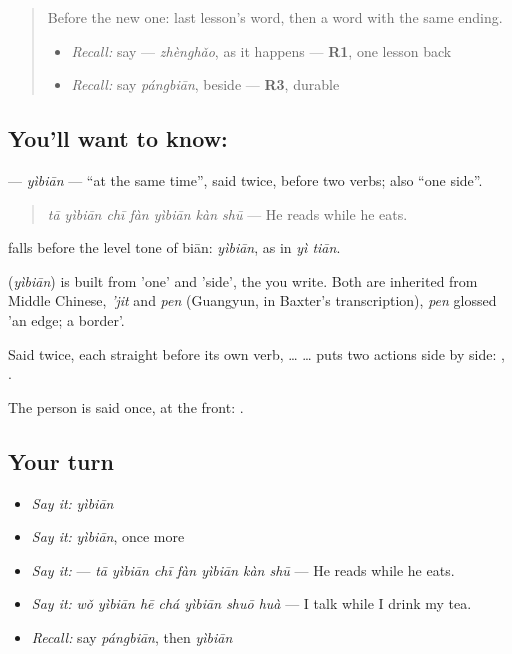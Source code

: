 \label{lesson:ZH-C149-yibian}



\begin{quote}
Before the new one: last lesson's word, then a word with the same ending.

\begin{itemize}
\raggedright
  \item \emph{Recall:} say  — \emph{zhènghǎo}, as it happens — \textbf{R1}, one lesson back
  \item \emph{Recall:} say \emph{pángbiān}, beside — \textbf{R3}, durable
\end{itemize}
\end{quote}

\subsection*{You'll want to know: }
\textbf{} — \emph{yìbiān} — \textquotedblleft{}at the same time\textquotedblright{}, said twice, before two verbs; also \textquotedblleft{}one side\textquotedblright{}.

\begin{quote}
\textbf{} \emph{tā yìbiān chī fàn yìbiān kàn shū} — He reads while he eats.
\end{quote}

 falls before the level tone of biān: \emph{yìbiān}, as in \emph{yì tiān}.

\begin{cousinweb}
\textbf{} (\emph{yìbiān}) is built from  'one' and  'side', the  you write. Both are inherited from Middle Chinese, \emph{'jit} and \emph{pen} (Guangyun, in Baxter's transcription), \emph{pen} glossed 'an edge; a border'.
\end{cousinweb}

\begin{grammarlens}[title={What you've built}]
Said twice, each straight before its own verb,  …  … puts two actions side by side: , .

The person is said once, at the front: .
\end{grammarlens}

\subsection*{Your turn}
\begin{itemize}
\raggedright
  \item \emph{Say it:} \emph{yìbiān}
  \item \emph{Say it:} \emph{yìbiān}, once more
  \item \emph{Say it:}  — \emph{tā yìbiān chī fàn yìbiān kàn shū} — He reads while he eats.
  \item \emph{Say it:} \emph{wǒ yìbiān hē chá yìbiān shuō huà} — I talk while I drink my tea.
  \item \emph{Recall:} say \emph{pángbiān}, then \emph{yìbiān}
\end{itemize}

